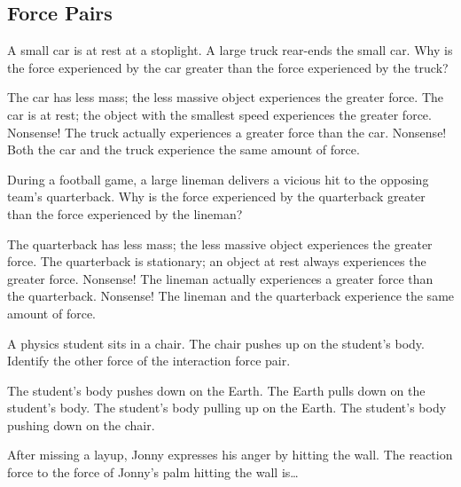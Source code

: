 \documentclass[answers]{exam}
\begin{document}
\clearpage

\subsection*{Force Pairs}

\begin{questions}
\question
A small car is at rest at a stoplight. A large truck rear-ends the small car. Why is the force experienced by the car greater than the force experienced by the truck?

\begin{randomizechoices}
    \choice The car has less mass; the less massive object experiences the greater force.
    \choice The car is at rest; the object with the smallest speed experiences the greater force.
    \choice Nonsense! The truck actually experiences a greater force than the car.
    \correctchoice Nonsense! Both the car and the truck experience the same amount of force.    
\end{randomizechoices}

\question
During a football game, a large lineman delivers a vicious hit to the opposing team’s quarterback. Why is the force experienced by the quarterback greater than the force experienced by the lineman?

\begin{randomizechoices}
    \choice The quarterback has less mass; the less massive object experiences the greater force.
    \choice The quarterback is stationary; an object at rest always experiences the greater force.
    \choice Nonsense! The lineman actually experiences a greater force than the quarterback.
    \correctchoice Nonsense! The lineman and the quarterback experience the same amount of force.    
\end{randomizechoices}

\question
A physics student sits in a chair. The chair pushes up on the student's body. Identify the other force of the interaction force pair.

\begin{randomizechoices}
    \choice The student's body pushes down on the Earth.
    \choice The Earth pulls down on the student's body.
    \choice The student's body pulling up on the Earth.
    \correctchoice The student's body pushing down on the chair.    
\end{randomizechoices}

\question
After missing a layup, Jonny expresses his anger by hitting the wall.  The reaction force to the force of Jonny's palm hitting the wall is\dots 


\end{questions}
\end{document}

